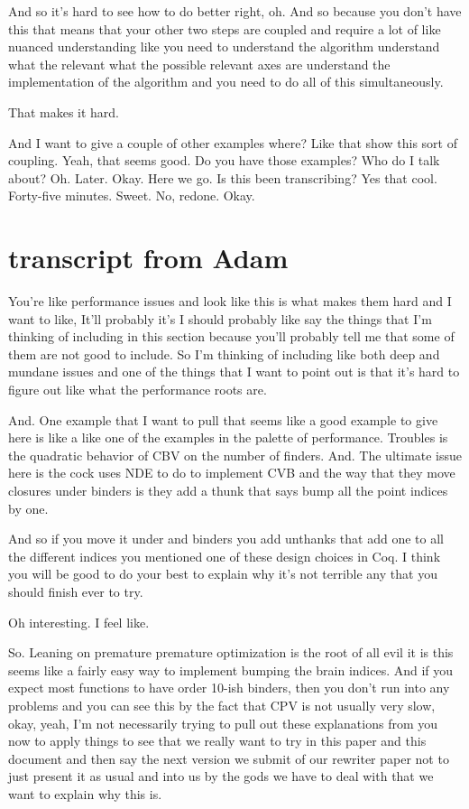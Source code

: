 \begin{subappendices}
    And so it's hard to see how to do better right, oh. And so because you don't have this that means that your other two steps are coupled and require a lot of like nuanced understanding like you need to understand the algorithm understand what the relevant what the possible relevant axes are understand the implementation of the algorithm and you need to do all of this simultaneously. 
    
    That makes it hard. 
    
    And I want to give a couple of other examples where? Like that show this sort of coupling. Yeah, that seems good. Do you have those examples? Who do I talk about? Oh. Later. Okay. Here we go. Is this been transcribing? Yes that cool. Forty-five minutes. Sweet. No, redone. Okay.
    
    
    \section{transcript from Adam}
    You're like performance issues and look like this is what makes them hard and I want to like, It'll probably it's I should probably like say the things that I'm thinking of including in this section because you'll probably tell me that some of them are not good to include. So I'm thinking of including like both deep and mundane issues and one of the things that I want to point out is that it's hard to figure out like what the performance roots are. 
    
    And. One example that I want to pull that seems like a good example to give here is like a like one of the examples in the palette of performance. Troubles is the quadratic behavior of CBV on the number of finders. And. The ultimate issue here is the cock uses NDE to do to implement CVB and the way that they move closures under binders is they add a thunk that says bump all the point indices by one. 
    
    And so if you move it under and binders you add unthanks that add one to all the different indices you mentioned one of these design choices in Coq. I think you will be good to do your best to explain why it's not terrible any that you should finish ever to try. 
    
    Oh interesting. I feel like. 
    
    So. Leaning on premature premature optimization is the root of all evil it is this seems like a fairly easy way to implement bumping the brain indices. And if you expect most functions to have order 10-ish binders, then you don't run into any problems and you can see this by the fact that CPV is not usually very slow, okay, yeah, I'm not necessarily trying to pull out these explanations from you now to apply things to see that we really want to try in this paper and this document and then say the next version we submit of our rewriter paper not to just present it as usual and into us by the gods we have to deal with that we want to explain why this is. 
    

\end{subappendices}
